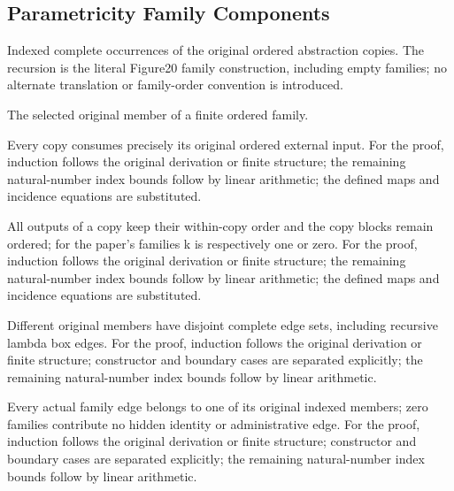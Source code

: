 \subsection{Parametricity Family Components}
Indexed complete occurrences of the original ordered abstraction copies. The recursion is the literal Figure20 family construction, including empty families; no alternate translation or family-order convention is introduced.

The selected original member of a finite ordered family.
\par{}

Every copy consumes precisely its original ordered external input.
For the proof, induction follows the original derivation or finite structure; the remaining natural-number index bounds follow by linear arithmetic; the defined maps and incidence equations are substituted.
\par{}

All outputs of a copy keep their within-copy order and the copy blocks remain ordered; for the paper's families k is respectively one or zero.
For the proof, induction follows the original derivation or finite structure; the remaining natural-number index bounds follow by linear arithmetic; the defined maps and incidence equations are substituted.
\par{}

Different original members have disjoint complete edge sets, including recursive lambda box edges.
For the proof, induction follows the original derivation or finite structure; constructor and boundary cases are separated explicitly; the remaining natural-number index bounds follow by linear arithmetic.
\par{}

Every actual family edge belongs to one of its original indexed members; zero families contribute no hidden identity or administrative edge.
For the proof, induction follows the original derivation or finite structure; constructor and boundary cases are separated explicitly; the remaining natural-number index bounds follow by linear arithmetic.
\par{}

